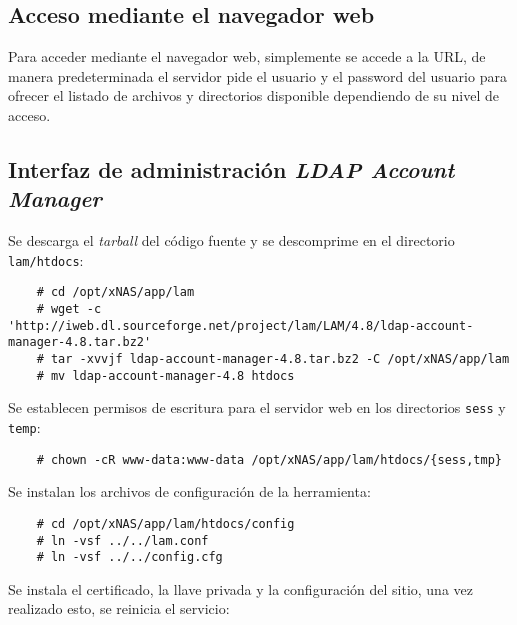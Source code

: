 %

      \subsection {Acceso mediante el navegador web}

Para acceder mediante el navegador web, simplemente se accede a la URL, de manera predeterminada el servidor pide el usuario y el password del usuario para ofrecer el listado de  archivos y directorios disponible dependiendo de su nivel de acceso.

      \subsection {Interfaz de administraci\'{o}n \textit{LDAP Account Manager}}

Se descarga el \textit{tarball} del c\'{o}digo fuente y se descomprime en el directorio \texttt{lam/htdocs}:

{
\scriptsize
\linespread{1}
\begin{verbatim}
    # cd /opt/xNAS/app/lam
    # wget -c 'http://iweb.dl.sourceforge.net/project/lam/LAM/4.8/ldap-account-manager-4.8.tar.bz2'
    # tar -xvvjf ldap-account-manager-4.8.tar.bz2 -C /opt/xNAS/app/lam
    # mv ldap-account-manager-4.8 htdocs
\end{verbatim}
}

Se establecen permisos de escritura para el servidor web en los directorios \texttt{sess} y \texttt{temp}:

{
\scriptsize
\linespread{1}
\begin{verbatim}
    # chown -cR www-data:www-data /opt/xNAS/app/lam/htdocs/{sess,tmp}
\end{verbatim}
}

Se instalan los archivos de configuraci\'{o}n de la herramienta:

{
\scriptsize
\linespread{1}
\begin{verbatim}
    # cd /opt/xNAS/app/lam/htdocs/config
    # ln -vsf ../../lam.conf
    # ln -vsf ../../config.cfg
\end{verbatim}
}

Se instala el certificado, la llave privada y la configuraci\'{o}n del sitio, una vez realizado esto, se reinicia el servicio:

